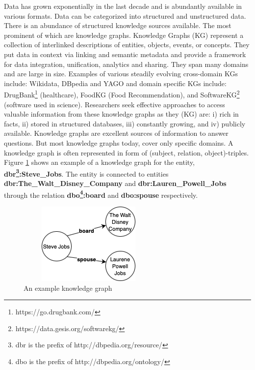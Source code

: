 \begin{sloppypar}
Data has grown exponentially in the last decade and is abundantly available in various formats. Data can be categorized into structured and unstructured data. There is an abundance of structured knowledge sources available. The most prominent of which are knowledge graphs. Knowledge Graphs (KG) represent a collection of interlinked descriptions of entities, objects, events, or concepts. They put data in context via linking and semantic metadata and provide a framework for data integration, unification, analytics and sharing\cite{article}. They span many domains and are large in size. Examples of various steadily evolving cross-domain KGs include: Wikidata\cite{wikidata}, DBpedia\cite{dbpedia} and YAGO\cite{yago}  and domain specific KGs include: DrugBank\footnote{https://go.drugbank.com/} (healthcare), FoodKG\cite{foodkg} (Food Recommendation), and SoftwareKG\footnote{https://data.gesis.org/softwarekg/} (software used in science). Researchers seek effective approaches to access valuable information from these knowledge graphs as they (KG) are: i) rich in facts, ii) stored in structured databases, iii) constantly growing, and  iv) publicly available. Knowledge graphs are excellent sources of information to answer questions. But most knowledge graphs today, cover only specific domains. A knowledge graph is often represented in form of (subject, relation, object)-triples. Figure \ref{fig:kgexample} shows an example of a knowledge graph for the entity, \textbf{dbr\footnote{dbr is the prefix of http://dbpedia.org/resource/}:Steve\_Jobs}. The entity is connected to entities \textbf{dbr:The\_Walt\_Disney\_Company} and \textbf{dbr:Lauren\_Powell\_Jobs} through the relation \textbf{dbo\footnote{dbo is the prefix of http://dbpedia.org/ontology/}:board} and \textbf{dbo:spouse} respectively.
\begin{figure}
    \centering
   \includegraphics[width=7cm, height=4cm]{chapters/figures/SJ.png}
    \caption{An example knowledge graph}
    \label{fig:kgexample}
\end{figure}


\end{sloppypar}
